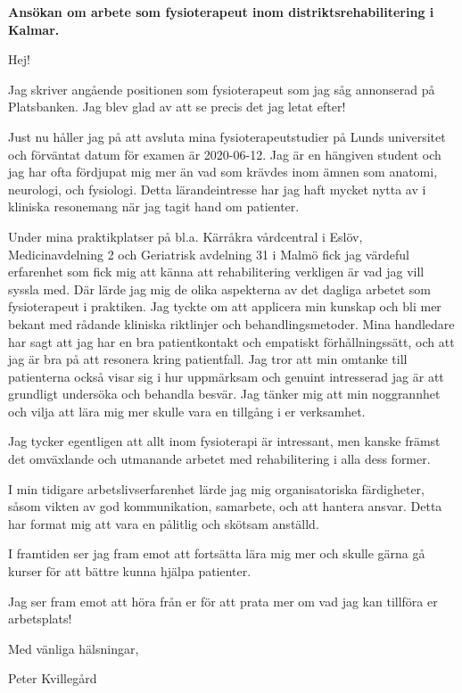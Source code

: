 \documentclass[10pt,a4paper]{letter}
\begin{document}
 
	\begin{letter}{} 
		
\opening{\textbf{Ansökan om arbete som fysioterapeut inom distriktsrehabilitering i Kalmar.}}
Hej!

Jag skriver angående positionen som fysioterapeut som jag såg annonserad på Platsbanken. Jag blev glad av att se precis det jag letat efter!

Just nu håller jag på att avsluta mina fysioterapeutstudier på Lunds universitet och förväntat \mbox{datum} för examen är 2020-06-12. Jag är en hängiven student och jag har ofta fördjupat mig mer än vad som krävdes inom ämnen som anatomi, neurologi, och fysiologi. Detta lärande\-intresse har jag haft mycket nytta av i kliniska resonemang när jag tagit hand om patienter.

Under mina praktikplatser på bl.a. Kärråkra vårdcentral i Eslöv, Medicinavdelning 2 och Geriatrisk avdelning 31 i Malmö fick jag värdeful erfarenhet som fick mig att känna att rehabilitering verkligen är vad jag vill syssla med. Där lärde jag mig de olika aspekterna av det dagliga arbetet som fysioterapeut i praktiken. Jag tyckte om att applicera min kunskap och bli mer bekant med rådande kliniska riktlinjer och behandlingsmetoder. Mina handledare har sagt att jag har en bra patientkontakt och empatiskt förhållningssätt, och att jag är bra på att resonera kring patientfall. Jag tror att min omtanke till patienterna också visar sig i hur uppmärksam och genuint intresserad jag är att grundligt undersöka och behandla besvär. Jag tänker mig att min noggrannhet och vilja att lära mig mer skulle vara en tillgång i er verksamhet.

Jag tycker egentligen att allt inom fysioterapi är intressant, men kanske främst det omväxlande och utmanande arbetet med rehabilitering i alla dess former.

I min tidigare arbetslivserfarenhet lärde jag mig organisatoriska färdigheter, såsom vikten av god kommunikation, samarbete, och att hantera ansvar. Detta har format mig att vara en pålitlig och skötsam anställd.

I framtiden ser jag fram emot att fortsätta lära mig mer och skulle gärna gå kurser för att bättre kunna hjälpa patienter.

Jag ser fram emot att höra från er för att prata mer om vad jag kan tillföra er arbetsplats!
	
\vspace{1em}
\hspace{0.1\linewidth}Med vänliga hälsningar,

\hspace{0.1\linewidth}Peter Kvillegård
		 
 
\end{letter} 
\end{document}
